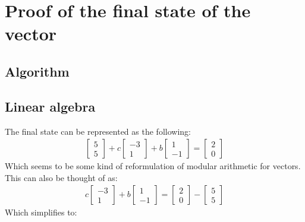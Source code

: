 \documentclass[letterpaper, 12pt]{article}
\begin{document}
\section{Proof of the final state of the vector}
\subsection{Algorithm}

\subsection{Linear algebra}
The final state can be represented as the following:
\begin{align*}
\begin{bmatrix}
	5\\
	5
\end{bmatrix}
+ c
\begin{bmatrix}
	-3\\
	1	
\end{bmatrix}
+ b
\begin{bmatrix}
	1\\
	-1	
\end{bmatrix}
 = 
\begin{bmatrix}
	2\\
	0
\end{bmatrix}
\end{align*}
Which seems to be some kind of reformulation of modular arithmetic for vectors.
This can also be thought of as:
\begin{align*}
c
\begin{bmatrix}
	-3\\
	1	
\end{bmatrix}
+ b
\begin{bmatrix}
	1\\
	-1	
\end{bmatrix}
=
\begin{bmatrix}
	2\\
	0
\end{bmatrix}
 - 
\begin{bmatrix}
	5\\
	5
\end{bmatrix}
\end{align*}
Which simplifies to:
\end{document}
